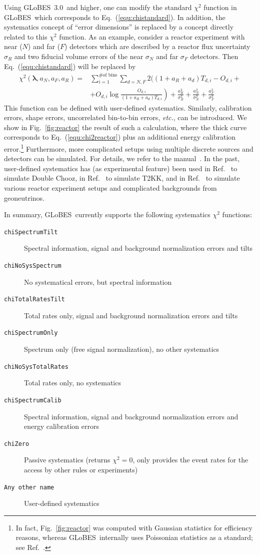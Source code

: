 \documentclass[12pt,a4paper]{article}
\newcommand{\etc}{{\it etc.}}
\newcommand{\eq}{Eq.}
\newcommand{\fig}{Fig.}
\newcommand{\Ref}{Ref.}
\newcommand{\GLOBES}{{\sf GLoBES}}
\newcommand{\GLOBESN}{{\sf GLoBES~3.0}}
\newcommand{\equ}[1]{\eq~(\ref{equ:#1})}
\newcommand{\figu}[1]{\fig~\ref{fig:#1}}
\begin{document}
Using \GLOBESN\ and higher, one can modify the standard $\chi^2$ function in
\GLOBES\ which corresponds to \equ{chistandard}. In addition, the systematics
concept of ``error dimensions'' is replaced by a concept directly related to
this $\chi^2$ function. As an example, consider a reactor experiment with near ($N$)
and far ($F$) detectors which are described by a reactor flux uncertainty $\sigma_R$
and two fiducial volume errors of the near $\sigma_N$ and far $\sigma_F$ detectors.
Then \equ{chistandard} will be replaced by
\begin{align}
  \chi^2(\boldsymbol{\lambda},a_N,a_F,a_R) = & \sum_{i=1}^{\textrm{\# of bins}} \sum_{d = N,F} 2
     \Big( (1 + a_R + a_d) T_{d,i} - O_{d,i} +  \nonumber \\
& \left. + O_{d,i} \log \frac{O_{d,i}}{(1 + a_R + a_d) T_{d,i}}  \right) 
          + \frac{a_R^2}{\sigma_R^2} + \frac{a_N^2}{\sigma_N^2} + \frac{a_F^2}{\sigma_F^2}
\label{equ:chi2reactor}
\end{align}
This function can be defined with user-defined systematics. Similarly, calibration errors, shape
errors, uncorrelated bin-to-bin errors, \etc , can be introduced. We show in \figu{reactor} the result of
such a calculation, where the thick curve corresponds to \equ{chi2reactor} plus an additional 
energy calibration error.\footnote{In fact, \figu{reactor} was computed with Gaussian statistics for
efficiency reasons, whereas \GLOBES\ internally uses Poissonian statistics as a standard; see \Ref~\cite{Manual}.}
Furthermore, more complicated setups using multiple discrete sources and detectors can be simulated. For details, we refer to the manual~\cite{Manual}.
In the past, user-defined systematics has (as experimental feature) been used in \Ref~\cite{Huber:2006vr} to
simulate Double Chooz, in \Ref~\cite{Barger:2006kp} to simulate T2KK, and in
\Ref~\cite{Kopp:2006mw} to simulate various reactor experiment setups and complicated
 backgrounds from geoneutrinos. 

In summary, \GLOBES\ currently supports the following systematics $\chi^2$ functions:
\begin{description}
\item[{\tt chiSpectrumTilt}]
 Spectral information, signal and background normalization errors and tilts 
\item[{\tt chiNoSysSpectrum}]
 No systematical errors, but spectral information
\item[{\tt chiTotalRatesTilt}]
 Total rates only, signal and background normalization errors and tilts 
\item[{\tt chiSpectrumOnly}]
 Spectrum only (free signal normalization), no other systematics 
\item[{\tt chiNoSysTotalRates}]
 Total rates only, no systematics
\item[{\tt chiSpectrumCalib}]
 Spectral information, signal and background normalization errors and energy calibration errors 
\item[{\tt chiZero}]
 Passive systematics (returns $\chi^2=0$, only provides the event rates for the access by other
rules or experiments)
\item[{\tt Any other name}]
 User-defined systematics
\end{description}
\end{document}
